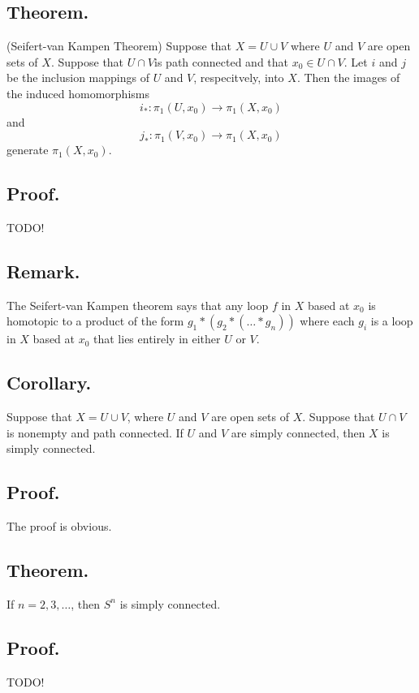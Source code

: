 \documentclass[titlepage]{article}
\begin{document}
\subsection{Theorem.} (Seifert-van Kampen Theorem) Suppose that $X = U \cup V$ where $U$ and $V$ are open sets of $X$. Suppose that $U \cap V$is path connected and that $x_{0} \in U \cap V$. Let $i$ and $j$ be the inclusion mappings of $U$ and $V$, respecitvely, into $X$. Then the images of the induced homomorphisms 
$$i_{*}: \pi_{1}(U, x_{0}) \to \pi_{1}(X, x_{0})$$
and 
$$j_{*}: \pi_{1}(V, x_{0}) \to \pi_{1}(X, x_{0})$$
generate $\pi_{1}(X, x_{0})$.

\subsection{Proof.} TODO!

\subsection{Remark.} The Seifert-van Kampen theorem says that any loop $f$ in $X$ based at $x_{0}$ is homotopic to a product of the form $g_{1} * (g_{2} * (\ldots * g_{n}))$ where each $g_{i}$ is a loop in $X$ based at $x_{0}$ that lies entirely in either $U$ or $V$.

\subsection{Corollary.} Suppose that $X = U \cup V$, where $U$ and $V$ are open sets of $X$. Suppose that $U \cap V$ is nonempty and path connected. If $U$ and $V$ are simply connected, then $X$ is simply connected.

\subsection{Proof.} The proof is obvious.

\subsection{Theorem.} If $n = 2, 3, \ldots$, then $S^{n}$ is simply connected.

\subsection{Proof.} TODO!
\end{document}
